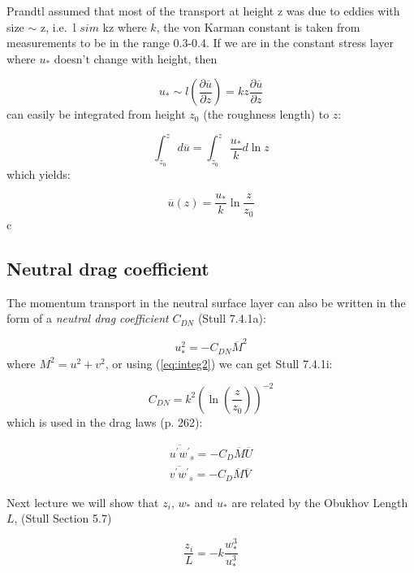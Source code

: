 \documentclass[12pt]{article}
\begin{document}
Prandtl assumed that most of the transport at height z was due to eddies
with size $\sim$ z, i.e.~l $sim$ kz where $k$, the von Karman constant is
taken from measurements to be in the range 0.3-0.4.  If we are in the constant
stress layer where $u_*$ doesn't change with height, then

 \begin{equation}
  \label{eq:stress}
  u_* \sim l \left ( \frac{\partial  \overline{ u}}{\partial z} \right )  = kz \frac{\partial  \overline{ u}}{\partial z}
\end{equation}
can easily be integrated from height $z_0$ (the roughness length) to $z$:

\begin{equation}
  \label{eq:integ}
  \int_{ z_0}^{z}\!\, d \overline{u } = \int_{ z_0}^{z}\!\,\frac{u_* }{k}  d \ln z
\end{equation}
which yields:

\begin{equation}
  \label{eq:integ2}
  \overline{u }(z) = \frac{ u_*}{k}  \ln \frac{z }{z_0} 
\end{equation}c


\subsection{Neutral drag coefficient}
\label{sec:neutr-drag-coeff}

The momentum transport in the neutral surface layer can also be written in the form of a \textit{neutral drag coefficient}
$C_{DN}$ (Stull 7.4.1a):

\begin{equation}
  \label{eq:drag}
  u_*^2 = - C_{DN} \overline{ M}^2
\end{equation}
where $M^2 = u^2 + v^2$, or using (\ref{eq:integ2}) we can get Stull 7.4.1i:

\begin{equation}
  \label{eq:cdn}
  C_{DN} = k^2 \left ( \ln \left ( \frac{ z}{z_0}   \right )  \right )^{-2}
\end{equation}
which is used in the drag laws (p. 262):


\begin{gather}
  \overline{u^\prime w^\prime}_s = -C_D \overline{M} \overline{U}\\
\overline{v^\prime w^\prime}_s = -C_D \overline{M} \overline{V}
\end{gather}

Next lecture we will show that 
$z_i$, $w_*$  and $u_*$ are related by the Obukhov Length $L$,
(Stull Section 5.7)

\begin{equation}
  \label{eq:mo}
  \frac{ z_i}{L} = -k \frac{ w^3_*}{u_*^3} 
\end{equation}
\end{document}
